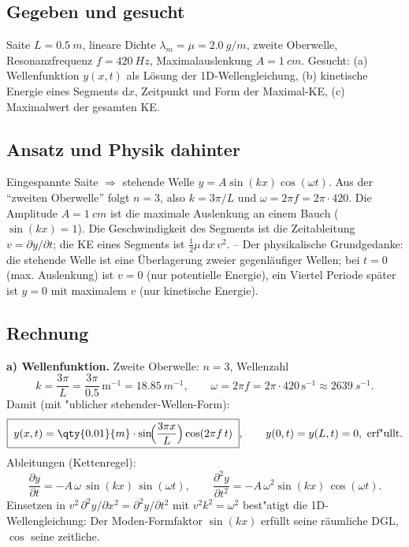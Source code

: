 
\subsection*{Gegeben und gesucht}
Saite $L=\qty{0.5}{m}$, lineare Dichte $\lambda_m=\mu=\qty{2.0}{g/m}$,
zweite Oberwelle, Resonanzfrequenz $f=\qty{420}{Hz}$, Maximalauslenkung
$A=\qty{1}{cm}$. Gesucht: (a) Wellenfunktion $y(x,t)$ als Lösung der
1D-Wellengleichung, (b) kinetische Energie eines Segments $\mathrm{d}x$,
Zeitpunkt und Form der Maximal-KE, (c) Maximalwert der gesamten KE.

\subsection*{Ansatz und Physik dahinter}
Eingespannte Saite $\Rightarrow$ stehende Welle $y=A\sin(kx)\cos(\omega t)$.
Aus der ``zweiten Oberwelle'' folgt $n=3$, also $k=3\pi/L$ und
$\omega=2\pi f=2\pi\cdot420$. Die Amplitude $A=\qty{1}{cm}$ ist die maximale
Auslenkung an einem Bauch ($\sin(kx)=1$). Die Geschwindigkeit des Segments
ist die Zeitableitung $v=\partial y/\partial t$; die KE eines Segments ist
$\frac12\mu\,\mathrm{d}x\,v^2$. -- Der physikalische Grundgedanke: die
stehende Welle ist eine Überlagerung zweier gegenläufiger Wellen; bei
$t=0$ (max. Auslenkung) ist $v=0$ (nur potentielle Energie), ein Viertel
Periode später ist $y=0$ mit maximalem $v$ (nur kinetische Energie).

\subsection*{Rechnung}
\textbf{a) Wellenfunktion.} Zweite Oberwelle: $n=3$, Wellenzahl
\begin{equation}
  k=\frac{3\pi}{L}=\frac{3\pi}{0.5}\,\mathrm{m^{-1}}=\qty{18.85}{m^{-1}},
  \qquad \omega=2\pi f=2\pi\cdot420\,\mathrm{s^{-1}}\approx\qty{2639}{s^{-1}}.
\end{equation}
Damit (mit "ublicher stehender-Wellen-Form):
\begin{equation}
  \boxed{\;y(x,t)=\qty{0.01}{m}\cdot\sin\!\Bigl(\frac{3\pi x}{L}\Bigr)
  \cos(2\pi f\,t)\;},\qquad
  y(0,t)=y(L,t)=0,\ \text{erf"ullt}.
\end{equation}
Ableitungen (Kettenregel):
\begin{equation}
  \frac{\partial y}{\partial t}=-A\,\omega\,\sin(kx)\,\sin(\omega t),
  \qquad
  \frac{\partial^2y}{\partial t^2}=-A\,\omega^2\sin(kx)\,\cos(\omega t).
\end{equation}
Einsetzen in $v^2\,\partial^2 y/\partial x^2=\partial^2 y/\partial t^2$ mit
$v^2k^2=\omega^2$ best"atigt die 1D-Wellengleichung: Der Moden-Formfaktor
$\sin(kx)$ erfüllt seine räumliche DGL, $\cos$ seine zeitliche.

